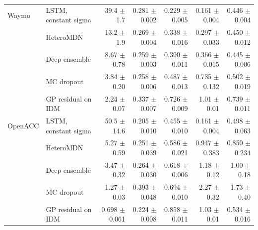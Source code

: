 \begin{table}[htbp]
\begin{tabular}{llrrrrr}
\midrule
Waymo & LSTM, constant sigma & 39.4 $\pm$ 1.7 & 0.281 $\pm$ 0.002 & 0.229 $\pm$ 0.005 & 0.161 $\pm$ 0.004 & 0.446 $\pm$ 0.004 \\
 & HeteroMDN & 13.2 $\pm$ 1.9 & 0.269 $\pm$ 0.004 & 0.338 $\pm$ 0.016 & 0.297 $\pm$ 0.033 & 0.450 $\pm$ 0.012 \\
 & Deep ensemble & 8.67 $\pm$ 0.78 & 0.259 $\pm$ 0.003 & 0.390 $\pm$ 0.011 & 0.366 $\pm$ 0.015 & 0.445 $\pm$ 0.006 \\
 & MC dropout & 3.84 $\pm$ 0.20 & 0.258 $\pm$ 0.006 & 0.487 $\pm$ 0.013 & 0.735 $\pm$ 0.132 & 0.502 $\pm$ 0.019 \\
 & GP residual on IDM & 2.24 $\pm$ 0.07 & 0.337 $\pm$ 0.007 & 0.726 $\pm$ 0.009 & 1.01 $\pm$ 0.01 & 0.739 $\pm$ 0.011 \\
\midrule
OpenACC & LSTM, constant sigma & 50.5 $\pm$ 14.6 & 0.205 $\pm$ 0.010 & 0.455 $\pm$ 0.010 & 0.161 $\pm$ 0.004 & 0.498 $\pm$ 0.063 \\
 & HeteroMDN & 5.27 $\pm$ 0.59 & 0.251 $\pm$ 0.039 & 0.586 $\pm$ 0.021 & 0.947 $\pm$ 0.383 & 0.850 $\pm$ 0.234 \\
 & Deep ensemble & 3.47 $\pm$ 0.32 & 0.264 $\pm$ 0.030 & 0.618 $\pm$ 0.006 & 1.18 $\pm$ 0.12 & 1.00 $\pm$ 0.18 \\
 & MC dropout & 1.27 $\pm$ 0.03 & 0.393 $\pm$ 0.048 & 0.694 $\pm$ 0.010 & 2.27 $\pm$ 0.32 & 1.73 $\pm$ 0.40 \\
 & GP residual on IDM & 0.698 $\pm$ 0.061 & 0.224 $\pm$ 0.008 & 0.858 $\pm$ 0.011 & 1.03 $\pm$ 0.01 & 0.534 $\pm$ 0.016 \\
\bottomrule
\end{tabular}
\end{table}
